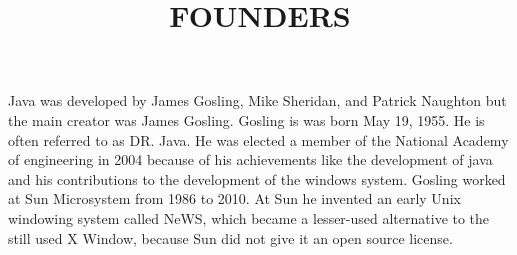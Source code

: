 \documentclass{article}
\title{FOUNDERS}
\begin{document}
	\maketitle
	
	Java was developed by James Gosling, Mike Sheridan, and Patrick Naughton but the main creator was James Gosling.
	Gosling is was born May 19, 1955. He is often referred to as DR. Java. He was elected a member of the National Academy of engineering in 2004 because of his achievements like the development of java and his contributions to the development of the windows system.
	Gosling worked at Sun Microsystem from 1986 to 2010. At Sun he invented an early Unix windowing system called NeWS, which became a lesser-used alternative to the still used X Window, because Sun did not give it an open source license.
	
\end{document}
